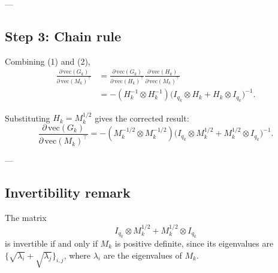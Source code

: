 \documentclass[10pt]{article}
\begin{document}
---

\subsection*{Step 3: Chain rule}

Combining (1) and (2),
\begin{align*}
\frac{\partial\,\mathrm{vec}(G_k)}{\partial\,\mathrm{vec}(M_k)^{\!\top}}
&=
\frac{\partial\,\mathrm{vec}(G_k)}{\partial\,\mathrm{vec}(H_k)^{\!\top}}
\frac{\partial\,\mathrm{vec}(H_k)}{\partial\,\mathrm{vec}(M_k)^{\!\top}} \\[1mm]
&=
- (H_k^{-1} \otimes H_k^{-1})
\bigl(I_{q_k} \otimes H_k + H_k \otimes I_{q_k}\bigr)^{-1}.
\end{align*}

Substituting $H_k = M_k^{1/2}$ gives the corrected result:
\begin{equation}\label{corrected}
\boxed{
\displaystyle
\frac{\partial\,\mathrm{vec}(G_k)}{\partial\,\mathrm{vec}(M_k)^{\!\top}}
= - (M_k^{-1/2} \otimes M_k^{-1/2})
\bigl(I_{q_k} \otimes M_k^{1/2} + M_k^{1/2} \otimes I_{q_k}\bigr)^{-1}.
}
\end{equation}

---

\subsection*{Invertibility remark}

The matrix 
\[
I_{q_k} \otimes M_k^{1/2} + M_k^{1/2} \otimes I_{q_k}
\]
is invertible if and only if $M_k$ is positive definite,
since its eigenvalues are $\{\sqrt{\lambda_i}+\sqrt{\lambda_j}\}_{i,j}$,
where $\lambda_i$ are the eigenvalues of $M_k$.
\end{document}
